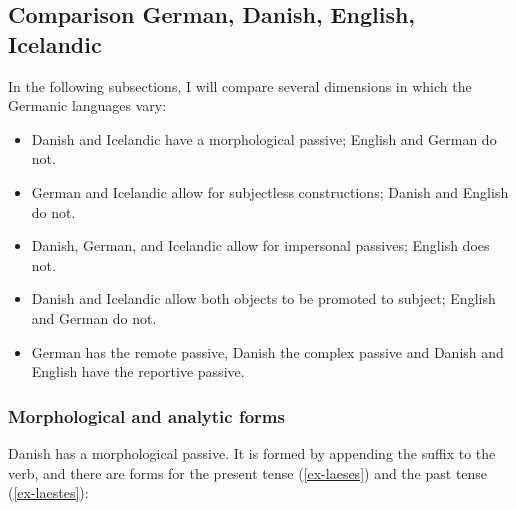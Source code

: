  \subsection{Comparison German, Danish, English, Icelandic}

In the following subsections, I will compare several dimensions in which the Germanic languages
vary:
\begin{itemize}
\item Danish and Icelandic have a morphological passive; English and German do not.

\item German and Icelandic allow for subjectless constructions; Danish and English do not.

\item Danish, German, and Icelandic allow for impersonal passives; English does not.

\item Danish and Icelandic allow both objects to be promoted to subject; English and German do not.

\item German has the remote passive, Danish the complex passive and Danish and English
  have the reportive passive.
\end{itemize}



\subsubsection{Morphological and analytic forms}

Danish has a morphological passive. It is formed by appending the suffix  to the verb, and there
are forms for the present tense (\ref{ex-laeses}) and the past tense (\ref{ex-laestes}):
\eal
{}
\zl

